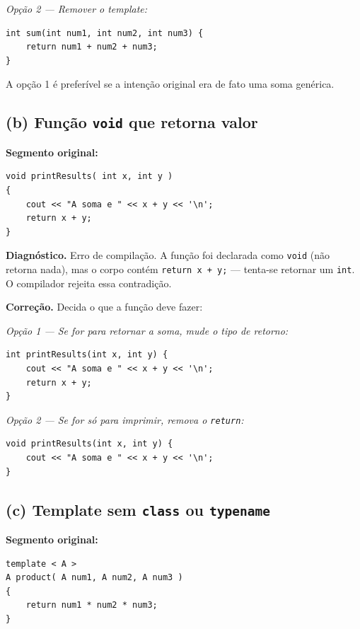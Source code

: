 \documentclass[11pt,a4paper]{article}
\begin{document}
\textit{Op\c{c}\~ao 2 --- Remover o template:}
\begin{lstlisting}[style=cppcode,numbers=none]
int sum(int num1, int num2, int num3) {
    return num1 + num2 + num3;
}
\end{lstlisting}

A op\c{c}\~ao 1 \'e prefer\'ivel se a inten\c{c}\~ao original era de fato uma soma gen\'erica.

\subsection*{(b) Fun\c{c}\~ao \texttt{void} que retorna valor}

\textbf{Segmento original:}
\begin{lstlisting}[style=cppcode,numbers=none]
void printResults( int x, int y )
{
    cout << "A soma e " << x + y << '\n';
    return x + y;
}
\end{lstlisting}

\textbf{Diagn\'ostico.} Erro de compila\c{c}\~ao. A fun\c{c}\~ao foi declarada como \texttt{void} (n\~ao retorna nada), mas o corpo cont\'em \texttt{return x + y;} --- tenta-se retornar um \texttt{int}. O compilador rejeita essa contradi\c{c}\~ao.

\textbf{Corre\c{c}\~ao.} Decida o que a fun\c{c}\~ao deve fazer:

\textit{Op\c{c}\~ao 1 --- Se for para retornar a soma, mude o tipo de retorno:}
\begin{lstlisting}[style=cppcode,numbers=none]
int printResults(int x, int y) {
    cout << "A soma e " << x + y << '\n';
    return x + y;
}
\end{lstlisting}

\textit{Op\c{c}\~ao 2 --- Se for s\'o para imprimir, remova o \texttt{return}:}
\begin{lstlisting}[style=cppcode,numbers=none]
void printResults(int x, int y) {
    cout << "A soma e " << x + y << '\n';
}
\end{lstlisting}

\subsection*{(c) Template sem \texttt{class} ou \texttt{typename}}

\textbf{Segmento original:}
\begin{lstlisting}[style=cppcode,numbers=none]
template < A >
A product( A num1, A num2, A num3 )
{
    return num1 * num2 * num3;
}
\end{lstlisting}
\end{document}

